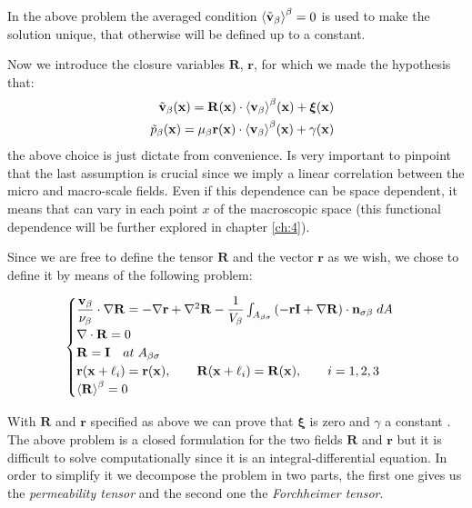 In the above problem the averaged condition ${\left< \tilde{\textbf{v}}_{\beta} \right>}^{\beta} = 0$ is used to make the solution unique, that otherwise will be defined up to a constant.

Now we introduce the closure variables $\mathbf{R}$, $\mathbf{r}$, for which we made the hypothesis that:
\begin{eqnarray}
&& \tilde{\textbf{v}}_{\beta}(\mathbf{x}) = \mathbf{R}(\mathbf{x})  \cdot {\left< \textbf{v}_{\beta}\right>}^{\beta}(\mathbf{x})  +\boldsymbol{\xi}(\mathbf{x})   \\
&& \tilde{p}_{\beta}(\mathbf{x})  = \mu_{\beta} \mathbf{r}(\mathbf{x})  \cdot {\left< \textbf{v}_{\beta}\right>}^{\beta}(\mathbf{x})  + \gamma(\mathbf{x})
	\label{eq:closure_viab_hp}
\end{eqnarray}
the above choice is just dictate from convenience.
Is very important to pinpoint that the last assumption is crucial since we imply a linear correlation between the micro and macro-scale fields.
Even if this dependence can be space dependent, it means that can vary in each point $x$ of the macroscopic space (this functional dependence will be further explored in chapter \ref{ch:4}).


Since we are free to define the tensor $\mathbf{R}$  and the vector $\mathbf{r}$ as we wish, we chose to define it by means of the following problem:

\begin{eqnarray}
	\begin{cases}
		\dfrac{\textbf{v}_{\beta}}{\nu_{\beta}} \cdot  \nabla \mathbf{R} = -\nabla \mathbf{r} + \nabla^2 \mathbf{R} - \dfrac{1}{V_\beta} \int_{A_{\beta \sigma}} \left(-\mathbf{r}\mathbf{I}  +  \nabla \mathbf{R} \right) \cdot \mathbf{n}_{\sigma \beta} \;dA  \\
		\nabla \cdot \mathbf{R} = 0  \\
		\mathbf{R} = \mathbf{I} \quad at \; A_{\beta \sigma} \\
		\mathbf{r}(\mathbf{x} +\ell_i) = \mathbf{r}(\mathbf{x}), \qquad \mathbf{R}(\mathbf{x} +\ell_i) = \mathbf{R}(\mathbf{x}), \qquad i=1,2,3 \\
		{\left< \mathbf{R} \right>}^{\beta} = 0
	\end{cases}
\label{eq:R_problem}
\end{eqnarray}

With  $\mathbf{R}$ and $\mathbf{r}$ specified as above we can prove that $\boldsymbol{\xi}$ is zero and $\gamma$ a constant \cite{whitaker1996forchheimer}.
The above problem is a closed formulation for the two fields  $\mathbf{R}$ and $\mathbf{r}$ but it is difficult to solve computationally since it is an integral-differential equation.
In order to simplify it we decompose the problem in two parts, the first one gives us the \textit{permeability tensor} and the second one the \textit{Forchheimer tensor}.

